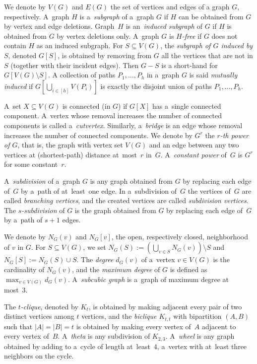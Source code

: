 \documentclass[a4paper,UKenglish,cleveref,autoref]{lipics-v2021}
\begin{document}
We denote by $V(G)$ and $E(G)$ the set of vertices and edges of a graph $G$, respectively.
A~graph $H$ is a~\emph{subgraph} of a~graph $G$ if $H$ can be obtained from $G$ by vertex and edge deletions.
Graph~$H$ is an~\emph{induced subgraph} of $G$ if $H$ is obtained from $G$ by vertex deletions only.
A~graph $G$ is \emph{$H$-free} if $G$ does not contain $H$ as an induced subgraph.
For $S \subseteq V(G)$, the \emph{subgraph of $G$ induced by $S$}, denoted $G[S]$, is obtained by removing from $G$ all the vertices that are not in $S$ (together with their incident edges).
Then $G-S$ is a short-hand for $G[V(G)\setminus S]$.
A collection of paths $P_1, \ldots, P_h$ in a~graph $G$ is said \emph{mutually induced} if $G[\bigcup_{i \in [h]} V(P_i)]$ is exactly the disjoint union of paths $P_1, \ldots, P_h$.

A~set $X \subseteq V(G)$ is connected (in $G$) if $G[X]$ has a~single connected component.
A~vertex whose removal increases the number of connected components is called a~\emph{cutvertex}.
Similarly, a~\emph{bridge} is an edge whose removal increases the number of connected components.
We denote by $G^r$ the \emph{$r$-th power of $G$}, that is, the graph with vertex set $V(G)$ and an edge between any two vertices at (shortest-path) distance at~most~$r$ in~$G$.
A~\emph{constant power} of~$G$ is $G^r$ for some constant~$r$. 

A~\emph{subdivision} of a~graph $G$ is any graph obtained from $G$ by replacing each edge of~$G$ by a~path of at~least~one edge.
In a~subdivision of~$G$ the vertices of~$G$ are called \emph{branching vertices}, and the created vertices are called \emph{subdivision vertices}.
The \emph{$s$-subdivision} of $G$ is the graph obtained from $G$ by replacing each edge of~$G$ by a~path of $s+1$ edges.
 
We denote by $N_G(v)$ and $N_G[v]$, the open, respectively closed, neighborhood of $v$ in $G$.
For $S \subseteq V(G)$, we set $N_G(S) := (\bigcup_{v \in S}N_G(v)) \setminus S$ and $N_G[S] := N_G(S) \cup S$.
The \emph{degree} $d_G(v)$ of a~vertex $v \in V(G)$ is the cardinality of $N_G(v)$, and the \emph{maximum degree} of $G$ is defined as $\max_{v \in V(G)} d_G(v)$.
A~\emph{subcubic graph} is a~graph of maximum degree at most~3.

The \emph{$t$-clique}, denoted by \emph{$K_t$}, is obtained by making adjacent every pair of two distinct vertices among $t$ vertices, and the \emph{biclique $K_{t,t}$} with bipartition $(A,B)$ such that $|A|=|B|=t$ is obtained by making every vertex of~$A$ adjacent to every vertex of~$B$.  
A~\emph{theta} is any subdivision of $K_{2,3}$.
A~\emph{wheel} is any graph obtained by adding to a~cycle of length at~least~4, a~vertex with at~least three neighbors on the cycle.
\end{document}
